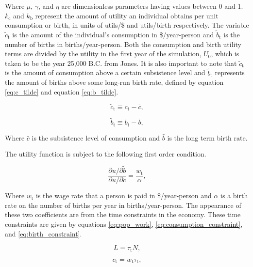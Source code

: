 \documentclass[letterpaper,12pt]{article}
\begin{document}
Where $\mu$, $\gamma$, and $\eta$ are dimensionless parameters having values between 0 and 1. $k_\mathrm{c}$ and $k_\mathrm{b}$ represent the amount of utility an individual obtains per unit consumption or birth, in units of utils/\$ and utils/birth respectively. The variable $\tilde c_\mathrm{t}$ is the amount of the individual's consumption in \$/year-person and $\tilde b_\mathrm{t}$ is the number of births in births/year-person. Both the consumption and birth utility terms are divided by the utility in the first year of the simulation, $U_\mathrm{0}$, which is taken to be the year 25,000 B.C. from Jones. It is also important to note that $\tilde c_\mathrm{t}$ is the amount of consumption above a certain subsistence level and $\tilde b_\mathrm{t}$ represents the amount of births above some long-run birth rate, defined by equation \ref{eq:c_tilde} and equation \ref{eq:b_tilde}.

\begin{equation} \label{eq:c_tilde}
\tilde c_\mathrm{t} \equiv c_\mathrm{t} - \bar c,
\end{equation}

\begin{equation} \label{eq:b_tilde}
\tilde b_\mathrm{t} \equiv b_\mathrm{t} - \bar b,
\end{equation}

Where $\bar c$ is the subsistence level of consumption and $\bar b$ is the long term birth rate.

The utility function is subject to the following first order condition.

\begin{equation} \label{eq:first_order_condition}
\frac{\partial u/ \partial\tilde b}{\partial u/ \partial\tilde c} = \frac{w_\mathrm{t}}{\alpha},
\end{equation}

Where $w_\mathrm{t}$ is the wage rate that a person is paid in \$/year-person and $\alpha$ is a birth rate on the number of births per year in births/year-person. The appearance of these two coefficients are from the time constraints in the economy. These time constraints are given by equations \ref{eq:pop_work}, \ref{eq:consumption_constraint}, and \ref{eq:birth_constraint}.

\begin{equation}\label{eq:pop_work}
L = \tau_\mathrm{t} N,
\end{equation}

\begin{equation} \label{eq:consumption_constraint}
c_\mathrm{t} = w_\mathrm{t} \tau_\mathrm{t},
\end{equation}
\end{document}
